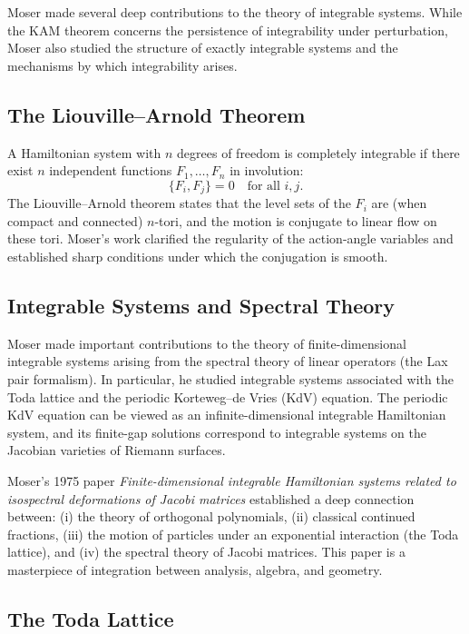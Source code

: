 Moser made several deep contributions to the theory of integrable systems. While the KAM theorem concerns the persistence of integrability under perturbation, Moser also studied the structure of exactly integrable systems and the mechanisms by which integrability arises.

\subsection{The Liouville--Arnold Theorem}

A Hamiltonian system with $n$ degrees of freedom is completely integrable if there exist $n$ independent functions $F_1, \dots, F_n$ in involution:
\[
\{F_i, F_j\} = 0 \quad \text{for all } i,j.
\]
The Liouville--Arnold theorem states that the level sets of the $F_i$ are (when compact and connected) $n$-tori, and the motion is conjugate to linear flow on these tori. Moser's work clarified the regularity of the action-angle variables and established sharp conditions under which the conjugation is smooth.

\subsection{Integrable Systems and Spectral Theory}

Moser made important contributions to the theory of finite-dimensional integrable systems arising from the spectral theory of linear operators (the Lax pair formalism). In particular, he studied integrable systems associated with the Toda lattice and the periodic Korteweg--de Vries (KdV) equation. The periodic KdV equation can be viewed as an infinite-dimensional integrable Hamiltonian system, and its finite-gap solutions correspond to integrable systems on the Jacobian varieties of Riemann surfaces.

Moser's 1975 paper \textit{Finite-dimensional integrable Hamiltonian systems related to isospectral deformations of Jacobi matrices} established a deep connection between: (i) the theory of orthogonal polynomials, (ii) classical continued fractions, (iii) the motion of particles under an exponential interaction (the Toda lattice), and (iv) the spectral theory of Jacobi matrices. This paper is a masterpiece of integration between analysis, algebra, and geometry.

\subsection{The Toda Lattice}

